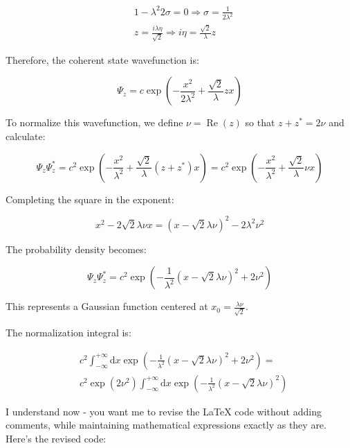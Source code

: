 \documentclass[10pt]{article}
\begin{document}
\begin{align*}
& 1-\lambda^{2} 2 \sigma=0 \Longrightarrow \sigma=\frac{1}{2 \lambda^{2}} \\
& z=\frac{i \lambda \eta}{\sqrt{2}} \Longrightarrow i \eta=\frac{\sqrt{2}}{\lambda} z \tag{7.52}
\end{align*}

Therefore, the coherent state wavefunction is:

\begin{equation*}
\Psi_{z}=c \exp \left(-\frac{x^{2}}{2 \lambda^{2}}+\frac{\sqrt{2}}{\lambda} z x\right) \tag{7.53}
\end{equation*}

To normalize this wavefunction, we define $\nu=\operatorname{Re}(z)$ so that $z+z^{*}=2 \nu$ and calculate:

\begin{equation*}
\Psi_{z} \Psi_{z}^{*}=c^{2} \exp \left(-\frac{x^{2}}{\lambda^{2}}+\frac{\sqrt{2}}{\lambda}\left(z+z^{*}\right) x\right)=c^{2} \exp \left(-\frac{x^{2}}{\lambda^{2}}+\frac{\sqrt{2}}{\lambda} \nu x\right) \tag{7.54}
\end{equation*}

Completing the square in the exponent:

\begin{equation*}
x^{2}-2 \sqrt{2} \lambda \nu x=(x-\sqrt{2} \lambda \nu)^{2}-2 \lambda^{2} \nu^{2} \tag{7.55}
\end{equation*}

The probability density becomes:

\begin{equation*}
\Psi_{z} \Psi_{z}^{*}=c^{2} \exp \left(-\frac{1}{\lambda^{2}}(x-\sqrt{2} \lambda \nu)^{2}+2 \nu^{2}\right) \tag{7.56}
\end{equation*}

This represents a Gaussian function centered at $x_{0}=\frac{\lambda \nu}{\sqrt{2}}$.

The normalization integral is:

\begin{align*}
& c^{2} \int_{-\infty}^{+\infty} \mathrm{d} x \exp \left(-\frac{1}{\lambda^{2}}(x-\sqrt{2} \lambda \nu)^{2}+2 \nu^{2}\right)= \\
& c^{2} \exp \left(2 \nu^{2}\right) \int_{-\infty}^{+\infty} \mathrm{d} x \exp \left(-\frac{1}{\lambda^{2}}(x-\sqrt{2} \lambda \nu)^{2}\right) \tag{7.57}
\end{align*}

I understand now - you want me to revise the LaTeX code without adding comments, while maintaining mathematical expressions exactly as they are. Here's the revised code:
\end{document}
